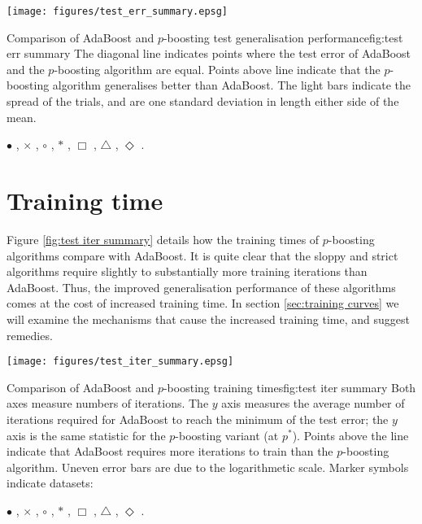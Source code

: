 \begin{linefigure}
\begin{center}
\texttt{[image: figures/test\_err\_summary.epsg]}
\end{center}
\begin{capt}{Comparison of AdaBoost and $p$-boosting test generalisation
performance}{fig:test err summary}
The diagonal line indicates points where the test error of AdaBoost
and the $p$-boosting algorithm are equal.  Points above line indicate
that the $p$-boosting algorithm generalises better than AdaBoost.  The
light bars indicate the spread of the trials, and are one standard
deviation in length either side of the mean.

 $\bullet$ , $\times$ , $\circ$
, $\ast$ , $\Box$ , $\bigtriangleup$
, $\Diamond$ .
\end{capt}
\end{linefigure}


\section{Training time}

Figure \ref{fig:test iter summary} details how the training times of
$p$-boosting algorithms compare with AdaBoost.  It is quite clear that
the sloppy and strict algorithms require slightly to substantially
more training iterations than AdaBoost.  Thus, the improved
generalisation performance of these algorithms comes at the cost of
increased training time.  In section \ref{sec:training curves} we will
examine the mechanisms that cause the increased training time, and
suggest remedies.

\begin{linefigure}
\begin{center}
\texttt{[image: figures/test\_iter\_summary.epsg]}
\end{center}
\begin{capt}{Comparison of AdaBoost and $p$-boosting training
times}{fig:test iter summary} 
Both axes measure numbers of iterations.  The $y$ axis measures the
average number of iterations required for AdaBoost to reach the
minimum of the test error; the $y$ axis is the same statistic for the
$p$-boosting variant (at $p^{\ast}$).  Points above the line indicate
that AdaBoost requires more iterations to train than the $p$-boosting
algorithm.  Uneven error bars are due to the logarithmetic scale.
Marker symbols indicate datasets: 

 $\bullet$ , $\times$ , $\circ$
, $\ast$ , $\Box$ , $\bigtriangleup$
, $\Diamond$ .
\end{capt}
\end{linefigure}


